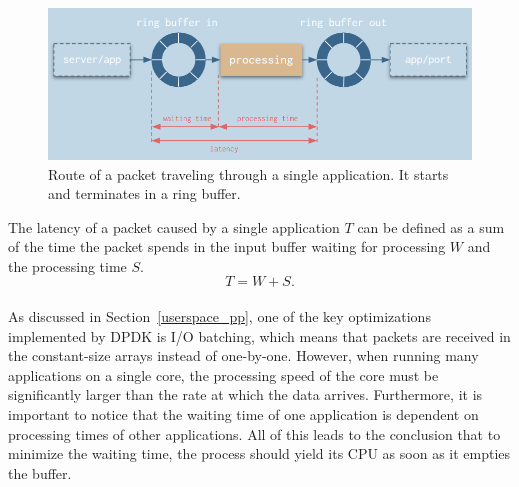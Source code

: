 \documentclass[english]{kththesis}
\begin{document}
\begin{figure}[!ht]
  \begin{center}
    \includegraphics[width=1\textwidth]{Fig9}
  \end{center}
  \caption{Route of a packet traveling through a single application. It starts and terminates in a ring buffer.}
  \label{fig:ringbuffers}
\end{figure}

The latency of a packet caused by a single application \(T\) can be defined as a sum of the time the packet spends in the input buffer waiting for processing \(W\) and the processing time \(S\).
\begin{equation}
\label{eq:0}
T = W + S.
\end{equation} \\
As discussed in Section~\ref{userspace_pp}, one of the key optimizations implemented by DPDK is I/O batching, which means that packets are received in the constant-size arrays instead of one-by-one. However, when running many applications on a single core, the processing speed of the core must be significantly  larger than the rate at which the data arrives. Furthermore, it is important to notice that the waiting time of one application is dependent on processing times of other applications. All of this leads to the conclusion that to minimize the waiting time, the process should yield its CPU as soon as it empties the buffer.
\end{document}
